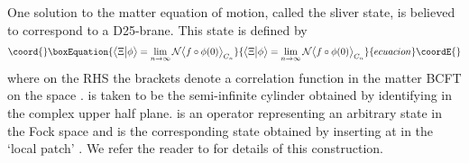 \documentclass[letterpaper,12pt]{article}
\def\Pcm#1{{\mathcal{#1}}}
\providecommand{\re}{\Re e \ }
\begin{document}
One solution \myHighlight{$\Xi$}\coordHE{} to the matter equation of motion, called the sliver state, is believed to 
correspond to a D25-brane. This state is defined by
\begin{equation}\coord{}\boxEquation{
\label{sliver}
\big\langle \Xi \big| \phi \big\rangle = \lim_{n \rightarrow \infty} 
                       \Pcm{N}\big\langle f \circ \phi(0) \big\rangle_{C_n}
}{
\big\langle \Xi \big| \phi \big\rangle = \lim_{n \rightarrow \infty} 
                       \Pcm{N}\big\langle f \circ \phi(0) \big\rangle_{C_n}
}{ecuacion}\coordE{}\end{equation}
where on the RHS the brackets denote a correlation function in the matter BCFT
on the space \coordHE{}. \coordHE{} is taken to be the semi-infinite cylinder 
obtained by identifying \myHighlight{$\re z \equiv \re z + n\pi/2$}\coordHE{} in the complex \coordHE{} upper half plane.
\myHighlight{$\phi$}\coordHE{} is an operator representing an arbitrary state in the Fock space 
and \myHighlight{$|\phi\rangle$}\coordHE{} is the corresponding state obtained by inserting \myHighlight{$\phi$}\coordHE{}
at \coordHE{} in the `local patch' \myHighlight{$-\pi/4 < \re z < \pi/4$}\coordHE{}. We refer the reader to 
\cite{RSZ5} for details of this construction.
\end{document}

